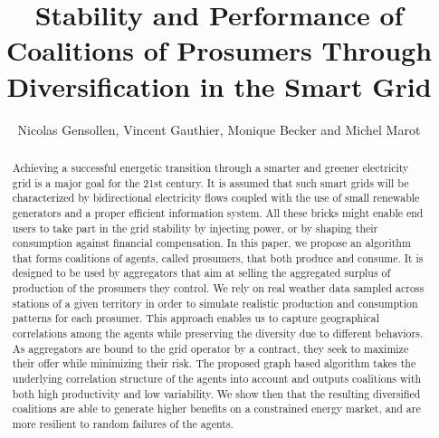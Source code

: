 \documentclass[journal]{IEEEtran}
\begin{document}
\pagestyle{plain}

%
%
\title{Stability and Performance of Coalitions of Prosumers Through Diversification in the Smart Grid}

%
%
\author{Nicolas Gensollen, Vincent Gauthier, Monique Becker and Michel Marot \\
}

\maketitle

%
%
\begin{abstract}
Achieving a successful energetic transition through a smarter and greener electricity grid is a major goal for the 21st century. It is assumed that such smart grids will be characterized by bidirectional electricity flows coupled with the use of small renewable generators and a proper efficient information system. All these bricks might enable end users to take part in the grid stability by injecting power, or by shaping their consumption against financial compensation. In this paper, we propose an algorithm that forms coalitions of agents, called prosumers, that both produce and consume. It is designed to be used by aggregators that aim at selling the aggregated surplus of production of the prosumers they control. We rely on real weather data sampled across stations of a given territory in order to simulate realistic production and consumption patterns for each prosumer. This approach enables us to capture geographical correlations among the agents while preserving the diversity due to different behaviors. As aggregators are bound to the grid operator by a contract, they seek to maximize their offer while minimizing their risk. The proposed graph based algorithm takes the underlying correlation structure of the agents into account and outputs coalitions with both high productivity and low variability. We show then that the resulting diversified coalitions are able to generate higher benefits on a constrained energy market, and are more resilient to random failures of the agents.
\end{abstract}
\end{document}
